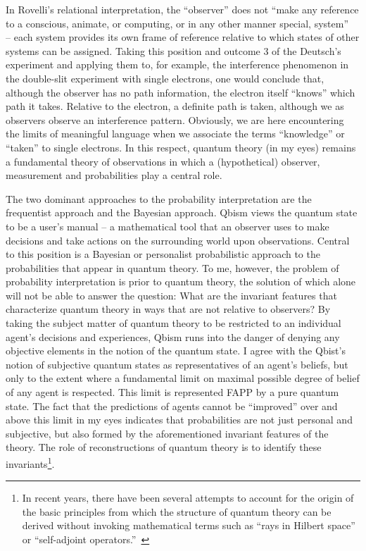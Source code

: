 \documentclass[12pt]{article}
\begin{document}
In Rovelli's relational interpretation, the ``observer'' does not ``make any reference to a conscious, animate, or computing, or in any other manner special, system''~\cite{rovelli} -- each system provides its own frame of reference relative to which states of other systems can be assigned. Taking this position and outcome 3 of the Deutsch's experiment and applying them to, for example, the interference phenomenon in the double-slit experiment with single electrons, one would conclude that, although the observer has no path information, the electron itself ``knows'' which path it takes. Relative to the electron, a definite path is taken, although we as observers observe an interference pattern. Obviously, we are here encountering the limits of meaningful language when we associate the terms ``knowledge'' or ``taken'' to single electrons. In this respect, quantum theory (in my eyes) remains a fundamental theory of observations in which a (hypothetical) observer, measurement and probabilities play a central role.

The two dominant approaches to the probability interpretation are the frequentist approach and the Bayesian approach. Qbism 
views the quantum state to be a user's manual --  a mathematical tool that an observer uses to make decisions and take actions on the surrounding world upon observations. Central to this position is a Bayesian or personalist probabilistic approach to the probabilities that appear in quantum theory. To me, however, the problem of probability interpretation is prior to quantum theory, the solution of which alone will not be able to answer the question: What are the invariant features that characterize quantum theory in ways that are not relative to observers? By taking the subject matter of quantum theory to be restricted to an individual agent's decisions and experiences, Qbism runs into the danger of denying any objective elements in the notion of the quantum state. I agree with the Qbist's notion of subjective quantum states as representatives of an agent's beliefs, but only to the extent where a fundamental limit on maximal possible degree of belief of any agent is respected. This limit is represented FAPP by a pure quantum state. The fact that the predictions of agents cannot be ``improved'' over and above this limit in my eyes indicates that probabilities are not just personal and subjective, but also formed by the aforementioned invariant features of the theory. The role of reconstructions of quantum theory is to identify these invariants\footnote{In recent years, there have been several attempts to account for the origin of the basic principles from which the structure of quantum theory can be derived without invoking mathematical terms such as ``rays in Hilbert space'' or ``self-adjoint operators.''~\cite{hardy,dakicbrukner,masanesmueller,chiribella}}.
\end{document}
